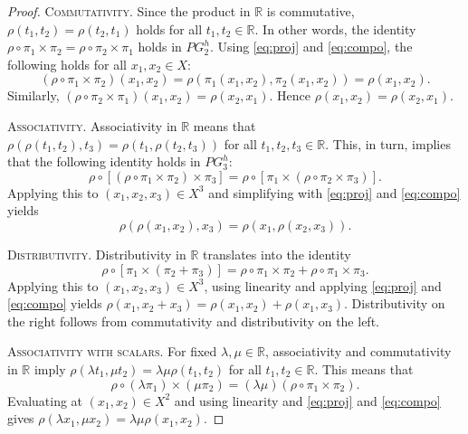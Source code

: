 \documentclass{amsart}
\theoremstyle{plain}
\theoremstyle{definition}
\theoremstyle{remark}
\newcommand\R{\ensuremath{\mathbb{R}}}
\begin{document}
\begin{proof}
    \textsc{Commutativity.} Since
    the product in $\R$ is commutative, $\rho (t_1,t_2)=\rho
    (t_2,t_1)$ holds for all $t_1,t_2 \in \R$. In other words, the identity $\rho
    \circ \pi _1\times \pi _2=\rho \circ \pi _2\times \pi _1$ holds in
    $PG_2^{h}$. Using \eqref{eq:proj} and \eqref{eq:compo}, the following holds for all
    $x_1,x_2\in X$:
    \[
        (\rho \circ \pi _1\times \pi _2)(x_1,x_2)=\rho (\pi
        _1(x_1,x_2),\pi _2(x_1,x_2))=\rho (x_1,x_2).
    \]
    Similarly, $(\rho \circ \pi _2\times \pi _1)(x_1,x_2)=\rho
    (x_2,x_1)$. Hence $\rho(x_1,x_2)=\rho (x_2,x_1)$.

    \textsc{Associativity.} Associativity in $\R$
    means that $\rho (\rho (t_1,t_2),t_3)=\rho (t_1,\rho (t_2,t_3))$
    for all $t_1,t_2,t_3\in \R$. This, in turn, implies that the
    following identity holds in $PG_3^{h}$:
    \[
        \rho \circ [(\rho \circ \pi _1\times \pi _2)\times \pi _3]=
        \rho \circ [\pi _1 \times (\rho \circ \pi _2\times \pi _3)].
    \]
    Applying this to $(x_1,x_2,x_3) \in X^{3}$ and simplifying
    with \eqref{eq:proj} and \eqref{eq:compo} yields
    \[
        \rho (\rho (x_1,x_2),x_3)=\rho (x_1,\rho (x_2,x_3)).
    \]

    \textsc{Distributivity.} Distributivity in $\R$ translates into
    the identity
    \[
        \rho \circ [\pi _1\times (\pi _2+\pi _3)]=\rho \circ \pi
        _1\times \pi _2+\rho \circ \pi _1\times \pi _3.
    \]
    Applying this to $(x_1,x_2,x_3) \in X^{3}$, using linearity and
applying \eqref{eq:proj} and \eqref{eq:compo} yields $\rho (x_1,x_2+x_3)=\rho (x_1,x_2)+\rho (x_1,x_3)$.
    Distributivity on the right follows from commutativity and
    distributivity on the left.

    \textsc{Associativity with scalars.} For fixed $\lambda ,\mu \in \R$,
    associativity and commutativity in $\R$ imply $\rho (\lambda t_1,\mu t_2)=\lambda
    \mu \rho (t_1,t_2)$ for all $t_1,t_2 \in \R$. This means that
    \[
    \rho \circ (\lambda \pi _1) \times (\mu \pi _2)=(\lambda \mu) (\rho
    \circ \pi _1\times \pi _2).
    \]
    Evaluating at $(x_1,x_2)\in X^2$ and using linearity and \eqref{eq:proj} and \eqref{eq:compo}
    gives $\rho (\lambda x_1,\mu x_2)=\lambda \mu \rho (x_1,x_2)$.


\end{proof}
\end{document}
